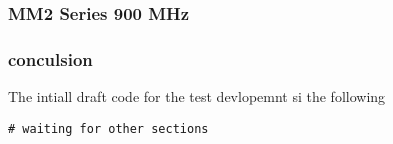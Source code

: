 \subsubsection{MM2 Series 900 MHz}

\subsubsection{conculsion}
The  intiall  draft  code  for  the  test  devlopemnt  si the  following
\begin{lstlisting}[style=mystyle,caption={Final draft test template}]
    # waiting for other sections 
\end{lstlisting}